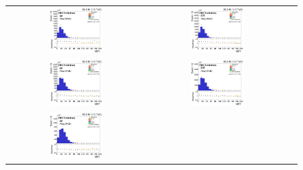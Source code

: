 \begin{figure}[ht]
  \begin{center}
    \begin{tabular}{ccc}
      \includegraphics[width=0.4\textwidth]{figures/tW/fig/Nvtx/10-15/ee/H_MET_Et.png}&
      \includegraphics[width=0.4\textwidth]{figures/tW/fig/Nvtx/10-15/mumu/H_MET_Et.png}\\
      \includegraphics[width=0.4\textwidth]{figures/tW/fig/Nvtx/15-20/ee/H_MET_Et.png}&
      \includegraphics[width=0.4\textwidth]{figures/tW/fig/Nvtx/15-20/mumu/H_MET_Et.png}\\
      \includegraphics[width=0.4\textwidth]{figures/tW/fig/Nvtx/20-25/ee/H_MET_Et.png}&

\end{tabular}
\end{center}
\end{figure}
